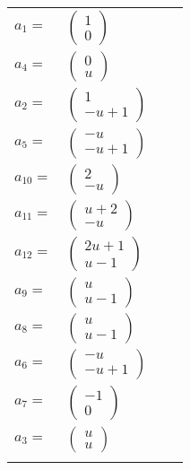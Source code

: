 \documentclass[1p]{elsarticle_modified}
\theoremstyle{definition}
\begin{document}
\begin{tabular}{m{7pt} m{180pt} m{7pt} m{180pt} }
\flushright $a_{1}=$&$\begin{pmatrix}1\\0\end{pmatrix}$ \\
\flushright $a_{4}=$&$\begin{pmatrix}0\\u\end{pmatrix}$ \\
\flushright $a_{2}=$&$\begin{pmatrix}1\\- u+1\end{pmatrix}$ \\
\flushright $a_{5}=$&$\begin{pmatrix}- u\\- u+1\end{pmatrix}$ \\
\flushright $a_{10}=$&$\begin{pmatrix}2\\- u\end{pmatrix}$ \\
\flushright $a_{11}=$&$\begin{pmatrix}u+2\\- u\end{pmatrix}$ \\
\flushright $a_{12}=$&$\begin{pmatrix}2 u+1\\u-1\end{pmatrix}$ \\
\flushright $a_{9}=$&$\begin{pmatrix}u\\u-1\end{pmatrix}$ \\
\flushright $a_{8}=$&$\begin{pmatrix}u\\u-1\end{pmatrix}$ \\
\flushright $a_{6}=$&$\begin{pmatrix}- u\\- u+1\end{pmatrix}$ \\
\flushright $a_{7}=$&$\begin{pmatrix}-1\\0\end{pmatrix}$ \\
\flushright $a_{3}=$&$\begin{pmatrix}u\\u\end{pmatrix}$\\&\end{tabular}
\end{document}

